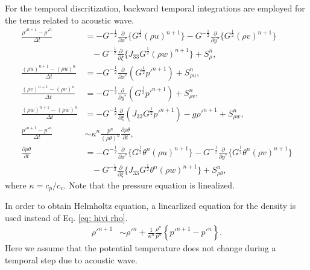 For the temporal discritization, backward temporal integrations are employed for the terms related to acoustic wave.
\begin{align}
  \frac{\rho'^{n+1}-\rho'^n}{\Delta t} &=
  -G^{-\frac{1}{2}}\frac{\partial}{\partial x^*}\{G^{\frac{1}{2}}(\rho u)^{n+1}\}
  -G^{-\frac{1}{2}}\frac{\partial}{\partial y^*}\{G^{\frac{1}{2}}(\rho v)^{n+1}\} \nonumber\\ & \;\;\;
  -G^{-\frac{1}{2}}\frac{\partial}{\partial \xi}\{J_{33}G^{\frac{1}{2}}(\rho w)^{n+1}\}
  + S_\rho^n, \label{eq: hivi rho} \\
  \frac{(\rho u)^{n+1}-(\rho u)^n}{\Delta t}
  &= -G^{-\frac{1}{2}}\frac{\partial}{\partial x^*}(G^{\frac{1}{2}}p'^{n+1}) + S_{\rho u}^n, \\
  \frac{(\rho v)^{n+1}-(\rho v)^n}{\Delta t}
  &= -G^{-\frac{1}{2}}\frac{\partial}{\partial y^*}(G^{\frac{1}{2}}p'^{n+1}) + S_{\rho v}^n, \\
  \frac{(\rho w)^{n+1}-(\rho w)^n}{\Delta t}
  &= -G^{-\frac{1}{2}}\frac{\partial}{\partial \xi}(J_{33}G^{\frac{1}{2}}p'^{n+1}) -g\rho'^{n+1} + S_{\rho w}^n, \\
  \frac{p'^{n+1} - p'^n}{\Delta t}
  &\sim \kappa^n \frac{p^n}{(\rho\theta)^n}\frac{\partial \rho\theta}{\partial t}, \\
  \frac{\partial \rho\theta}{\partial t} &=
  -G^{-\frac{1}{2}}\frac{\partial}{\partial x^*}\{G^{\frac{1}{2}}\theta^n (\rho u)^{n+1}\}
  -G^{-\frac{1}{2}}\frac{\partial}{\partial y^*}\{G^{\frac{1}{2}}\theta^n (\rho v)^{n+1}\}  \nonumber\\ & \;\;\;
  -G^{-\frac{1}{2}}\frac{\partial}{\partial \xi}\{J_{33}G^{\frac{1}{2}}\theta^n (\rho w)^{n+1}\}
  + S_{\rho\theta}^n,
\end{align}
where $\kappa = c_p/c_v$.
Note that the pressure equation is linealized.

In order to obtain Helmholtz equation, a linearlized equation for the density is used instead of Eq. \ref{eq: hivi rho}.
\begin{align}
  \rho'^{n+1} &\sim
  \rho'^n + \frac{1}{\kappa^n} \frac{\rho^n}{p^n} \left\{p'^{n+1}-p'^n\right\}.
\end{align}
Here we assume that the potential temperature does not change during a temporal step due to acoustic wave.

